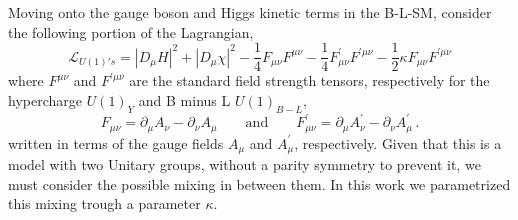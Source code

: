 Moving onto the gauge boson and Higgs kinetic terms in the B-L-SM, consider the following portion of the Lagrangian,
\begin{equation}
\mathcal{L}_{U(1)'s} =  \left| D_\mu H \right|^2 + \left| D_\mu \chi \right|^2 -\dfrac{1}{4} F_{\mu \nu} F^{\mu \nu} -\dfrac{1}{4} F^\prime_{\mu \nu} F^{\prime \mu \nu} -\dfrac{1}{2} \kappa F_{\mu \nu} F^{\prime \mu \nu}
\label{eq:Lu1}
\end{equation}
where $F^{\mu \nu}$ and $F^{\prime \mu \nu}$ are the standard field strength tensors, respectively for the hypercharge $U(1)_{Y}$ and B minus L $U(1)_{B-L}$, 
\begin{equation}
	F_{\mu \nu} = \partial_\mu A_\nu - \partial_\nu A_\mu 
	\qquad
	\text{and}
	\qquad
	 F^\prime_{\mu \nu} = \partial_\mu A^\prime_\nu - \partial_\nu A^\prime_\mu\,.
	 \label{eq:Fmn}
\end{equation}
written in terms of the gauge fields $A_\mu$ and $A_\mu^\prime$, respectively. Given that this is a model with two Unitary groups, without a parity symmetry to prevent it, we must consider the possible mixing in between them. In this work we parametrized this mixing trough a parameter $\kappa$.

